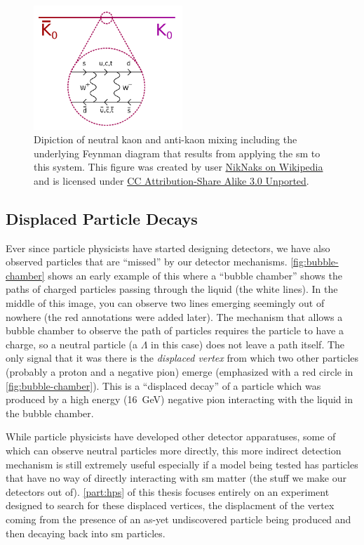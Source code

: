 \begin{figure}
  \centering
  \includegraphics[width=0.5\textwidth]{figures/intro/Kaon-box-diagram-with-bar.pdf}
  \caption{
    Dipiction of neutral kaon and anti-kaon mixing including the underlying
    Feynman diagram that results from applying the \ac{sm} to this system.
    This figure was created by user
    \href{https://commons.wikimedia.org/wiki/File:Kaon-box-diagram-with-bar.svg}{NikNaks on Wikipedia}
    and is licensed under
    \href{https://creativecommons.org/licenses/by-sa/3.0/deed.en}{CC Attribution-Share Alike 3.0 Unported}.
  }
  \label{fig:kaon-box-diagram}
\end{figure}

\subsection{Displaced Particle Decays}
Ever since particle physicists have started designing detectors, we have also observed particles
that are ``missed'' by our detector mechanisms. \cref{fig:bubble-chamber} shows an early example of
this where a ``bubble chamber'' shows the paths of charged particles passing through the liquid
(the white lines). In the middle of this image, you can observe two lines emerging seemingly out of
nowhere (the red annotations were added later). The mechanism that allows a bubble chamber to
observe the path of particles requires the particle to have a charge, so a neutral particle (a
\(\Lambda\) in this case) does not leave a path itself. The only signal that it was there is the
\emph{displaced vertex} from which two other particles (probably a proton and a negative pion)
emerge (emphasized with a red circle in \cref{fig:bubble-chamber}). This is a ``displaced decay''
of a particle which was produced by a high energy (\qty{16}{\giga\electronvolt}) negative pion
interacting with the liquid in the bubble chamber.

While particle physicists have developed other detector apparatuses, some of which can observe
neutral particles more directly, this more indirect detection mechanism is still extremely useful
especially if a model being tested has particles that have no way of directly interacting with
\ac{sm} matter (the stuff we make our detectors out of). \cref{part:hps} of this thesis focuses
entirely on an experiment designed to search for these displaced vertices, the displacment of the
vertex coming from the presence of an as-yet undiscovered particle being produced and then decaying
back into \ac{sm} particles.

